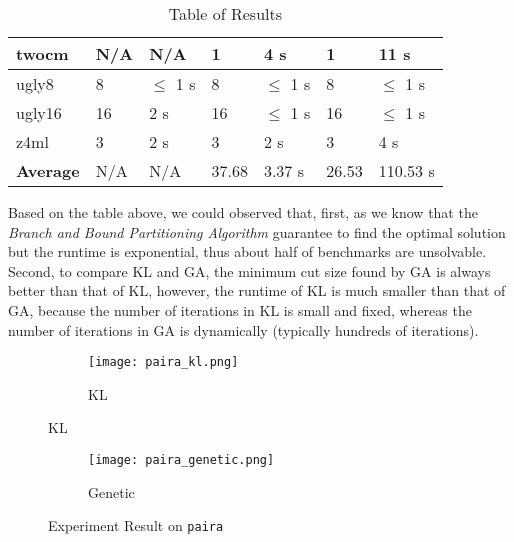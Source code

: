 \documentclass[11pt]{article}
\begin{document}
\begin{table}[H]
\begin{tabular}{ C{8em} |  C{5em} |  C{5em} | C{5em} |  C{5em} | C{5em}| C{5em} }
		\hline
		twocm            & N/A & N/A          & 1     & 4 s          & 1     & 11 s         \\
		\hline
		ugly8            & 8   & \(\leq\) 1 s & 8     & \(\leq\) 1 s & 8     & \(\leq\) 1 s \\
		\hline
		ugly16           & 16  & 2 s          & 16    & \(\leq\) 1 s & 16    & \(\leq\) 1 s \\
		\hline
		z4ml             & 3   & 2 s          & 3     & 2 s          & 3     & 4 s          \\
		\hline
		\hline
		\textbf{Average} & N/A & N/A          & 37.68 & 3.37 s       & 26.53 & 110.53 s     \\
		\hline
	\end{tabular}
	\caption{Table of Results}
	\label{table:result}
\end{table}

Based on the table above, we could observed that, first, as we know that the \textit{Branch and Bound Partitioning Algorithm} 
guarantee to find the optimal solution but the runtime is exponential, thus about half of benchmarks
are unsolvable. Second, to compare KL and GA, the minimum cut size found by GA is always better than
that of KL, however, the runtime of KL is much smaller than that of GA, because the number of iterations 
in KL is small and fixed, whereas the number of iterations in GA is dynamically (typically hundreds of 
iterations).


\begin{figure}[H]
	\centering
	\begin{subfigure}[b]{\textwidth}
		\centering
		\texttt{[image: paira\_kl.png]}
		\caption{KL}
	\end{subfigure}
	\hfill
\end{figure}
\begin{figure}[H]\ContinuedFloat
	\centering
	\begin{subfigure}[b]{\textwidth}
		\centering
		\texttt{[image: paira\_genetic.png]}
		\caption{Genetic}
	\end{subfigure}
	\caption{Experiment Result on \texttt{paira}}
\end{figure}

\noindent

\newpage






\nocite{*}
\end{document}
